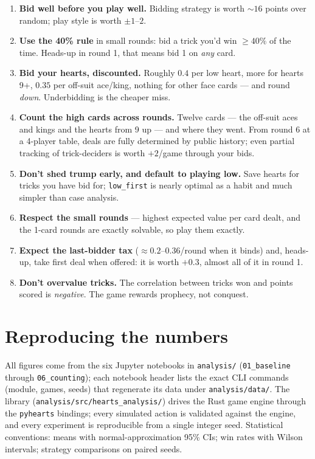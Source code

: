 \documentclass[11pt]{article}
\begin{document}
\begin{enumerate}
\item \textbf{Bid well before you play well.} Bidding strategy is worth
$\sim 16$ points over random; play style is worth $\pm 1$--$2$.
\item \textbf{Use the 40\% rule} in small rounds: bid a trick you'd win
$\geq 40\%$ of the time. Heads-up in round 1, that means bid 1 on
\emph{any} card.
\item \textbf{Bid your hearts, discounted.} Roughly $0.4$ per low heart,
more for hearts 9+, $0.35$ per off-suit ace/king, nothing for other face
cards --- and round \emph{down}. Underbidding is the cheaper miss.
\item \textbf{Count the high cards across rounds.} Twelve cards --- the
off-suit aces and kings and the hearts from 9 up --- and where they went.
From round 6 at a 4-player table, deals are fully determined by public
history; even partial tracking of trick-deciders is worth $+2$/game
through your bids.
\item \textbf{Don't shed trump early, and default to playing low.} Save
hearts for tricks you have bid for; \texttt{low\_first} is nearly optimal
as a habit and much simpler than case analysis.
\item \textbf{Respect the small rounds} --- highest expected value per
card dealt, and the 1-card rounds are exactly solvable, so play them
exactly.
\item \textbf{Expect the last-bidder tax} ($\approx 0.2$--$0.36$/round when
it binds) and, heads-up, take first deal when offered: it is worth
$+0.3$, almost all of it in round 1.
\item \textbf{Don't overvalue tricks.} The correlation between tricks won
and points scored is \emph{negative}. The game rewards prophecy, not
conquest.
\end{enumerate}

\appendix
\section{Reproducing the numbers}

All figures come from the six Jupyter notebooks in \texttt{analysis/}
(\texttt{01\_baseline} through \texttt{06\_counting}); each notebook header
lists the exact CLI commands (module, games, seeds) that regenerate its
data under \texttt{analysis/data/}. The library
(\texttt{analysis/src/hearts\_analysis/}) drives the Rust game engine
through the \texttt{pyhearts} bindings; every simulated action is validated
against the engine, and every experiment is reproducible from a single
integer seed. Statistical conventions: means with normal-approximation 95\%
CIs; win rates with Wilson intervals; strategy comparisons on paired seeds.
\end{document}
